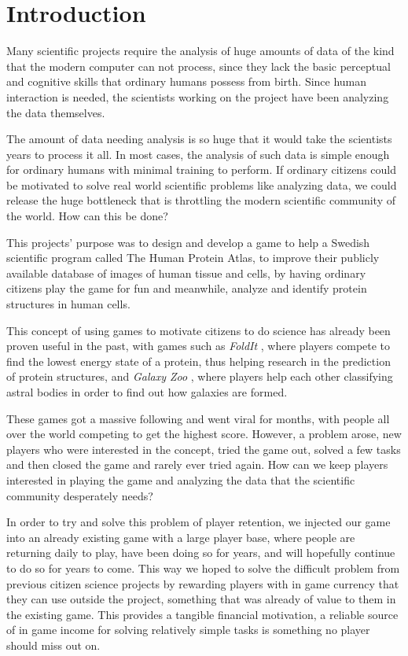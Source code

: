 \section{Introduction}\label{sec:introduction}

Many scientific projects require the analysis of huge amounts of data of the kind that the modern computer can not process, since they lack the basic perceptual and cognitive skills that ordinary humans possess from birth. Since human interaction is needed, the scientists working on the project have been analyzing the data themselves.

The amount of data needing analysis is so huge that it would take the scientists years to process it all. In most cases, the analysis of such data is simple enough for ordinary humans with minimal training to perform. If ordinary citizens could be motivated to solve real world scientific problems like analyzing data, we could release the huge bottleneck that is throttling the modern scientific community of the world. How can this be done?

This projects' purpose was to design and develop a game to help a Swedish scientific program called The Human Protein Atlas, to improve their publicly available database of images of human tissue and cells, by having ordinary citizens play the game for fun and meanwhile, analyze and identify protein structures in human cells.

This concept of using games to motivate citizens to do science has already been proven useful in the past, with games such as \emph{FoldIt} \cite{foldit}, where players compete to find the lowest energy state of a protein, thus helping research in the prediction of protein structures, and \emph{Galaxy Zoo} \cite{galaxyzoo}, where players help each other classifying astral bodies in order to find out how galaxies are formed.

These games got a massive following and went viral for months, with people all over the world competing to get the highest score. However, a problem arose, new players who were interested in the concept, tried the game out, solved a few tasks and then closed the game and rarely ever tried again. How can we keep players interested in playing the game and analyzing the data that the scientific community desperately needs?

In order to try and solve this problem of player retention, we injected our game into an already existing game with a large player base, where people are returning daily to play, have been doing so for years, and will hopefully continue to do so for years to come. This way we hoped to solve the difficult problem from previous citizen science projects by rewarding players with in game currency that they can use outside the project, something that was already of value to them in the existing game. This provides a tangible financial motivation, a reliable source of in game income for solving relatively simple tasks is something no player should miss out on.

